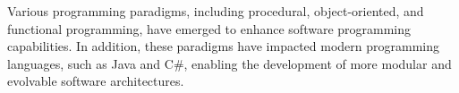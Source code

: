 Various programming paradigms, including procedural, object-oriented, and functional
programming, have emerged to enhance software programming capabilities. In addition, these
paradigms have impacted modern programming languages, such as Java and C\#, enabling the
development of more modular and evolvable software architectures.







